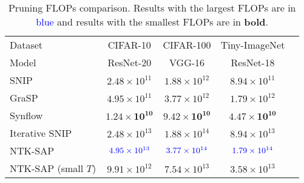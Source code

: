 

\begin{table*}
    \begin{center}
    \caption{Pruning FLOPs comparison. Results with the largest FLOPs are in \textcolor{blue}{blue} and results with the smallest FLOPs are in \textbf{bold}.}     \label{tab:appendix-flops-prune}
    {
    \begin{tabular}{l cccc}
    \\
    \hline
    \toprule
    Dataset &CIFAR-10&CIFAR-100&Tiny-ImageNet&\\
    \cmidrule(lr){1-1} \cmidrule(lr){2-2} \cmidrule(lr){3-3} \cmidrule(lr){4-4} 
    Model &ResNet-20&VGG-16&ResNet-18\\
    \midrule
    SNIP & $2.48 \times 10^{11}$ & $1.88 \times 10^{12}$ & $8.94 \times 10^{11}$  \\
    GraSP & $4.95 \times 10^{11}$ & $3.77 \times 10^{12}$ & $1.79 \times 10^{12}$  \\
    Synflow & $\boldsymbol{1.24 \times 10^{10}}$ & $\boldsymbol{9.42 \times 10^{10}}$ & $\boldsymbol{4.47 \times 10^{10}}$  \\
    Iterative SNIP & $2.48 \times 10^{13}$ & $1.88 \times 10^{14}$ & $8.94 \times 10^{13}$ \\
    NTK-SAP & $\color{blue}{4.95 \times 10^{13}}$ & $\color{blue}{3.77 \times 10^{14}}$ & $\color{blue}{1.79 \times 10^{14}}$ \\
    NTK-SAP (small $T$) & $9.91 \times 10^{12}$ & $7.54 \times 10^{13}$ & $3.58 \times 10^{13}$  \\

    \bottomrule
    \end{tabular}
    
    }
    
    \end{center}



\end{table*}
